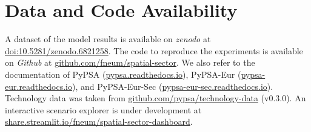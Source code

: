 \documentclass[12pt,preprint]{elsarticle}
\begin{document}
\section*{Data and Code Availability}

A dataset of the model results is available on \textit{zenodo} at \href{https://doi.org/10.5281/zenodo.6821258}{doi:10.5281/zenodo.6821258}.
The code to reproduce the experiments is available on \textit{Github} at \href{https://github.com/fneum/spatial-sector}{github.com/fneum/spatial-sector}.
We also refer to the documentation of PyPSA (\href{https://pypsa.readthedocs.io}{pypsa.readthedocs.io}),
PyPSA-Eur (\href{https://pypsa-eur.readthedocs.io}{pypsa-eur.readthedocs.io}), and
PyPSA-Eur-Sec (\href{https://pypsa-eur-sec.readthedocs.io}{pypsa-eur-sec.readthedocs.io}).
Technology data was taken from \href{https://github.com/pypsa/technology-data}{github.com/pypsa/technology-data} (v0.3.0).
An interactive scenario explorer is under development at \href{https://share.streamlit.io/fneum/spatial-sector-dashboard}{share.streamlit.io/fneum/spatial-sector-dashboard}.

\renewcommand{\ttdefault}{\sfdefault}
%



\newpage

\makeatletter
\renewcommand \thesection{S\@arabic\c@section}
\renewcommand\thetable{S\@arabic\c@table}
\renewcommand \thefigure{S\@arabic\c@figure}
\makeatother

\renewcommand{\citenumfont}[1]{S#1}

\setcounter{equation}{0}
\setcounter{figure}{0}
\setcounter{table}{0}
\setcounter{section}{0}



\renewcommand{\ttdefault}{\sfdefault}

\newpage
\begin{small}
	\tableofcontents
\end{small}
\end{document}
